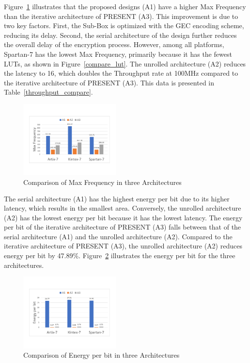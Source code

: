 \documentclass[final,5p,times,twocolumn]{elsarticle}
\begin{document}
Figure~\ref{compare-maxF} illustrates that the proposed designs (A1) have a higher Max Frequency than the iterative architecture of PRESENT (A3). This improvement is due to two key factors. First, the Sub-Box is optimized with the GEC encoding scheme, reducing its delay. Second, the serial architecture of the design further reduces the overall delay of the encryption process. However, among all platforms, Spartan-7 has the lowest Max Frequency, primarily because it has the fewest LUTs, as shown in Figure~\ref{compare_lut}. The unrolled architecture (A2) reduces the latency to 16, which doubles the Throughput rate at 100MHz compared to the iterative architecture of PRESENT (A3). This data is presented in Table~\ref{throughput_compare}.

\begin{figure}
    \centering
    \includegraphics[width=0.45\textwidth]{compare-maxf.pdf}
    \caption{Comparison of Max Frequency in three Architectures}\label{compare-maxF}
\end{figure}

The serial architecture (A1) has the highest energy per bit due to its higher latency, which results in the smallest area. Conversely, the unrolled architecture (A2) has the lowest energy per bit because it has the lowest latency. The energy per bit of the iterative architecture of PRESENT (A3) falls between that of the serial architecture (A1) and the unrolled architecture (A2). Compared to the iterative architecture of PRESENT (A3), the unrolled architecture (A2) reduces energy per bit by 47.89\%. Figure~\ref{compare-energy} illustrates the energy per bit for the three architectures.

\begin{figure}
    \centering
    \includegraphics[width=0.45\textwidth]{compare-energy.pdf}
    \caption{Comparison of Energy per bit in three Architectures}\label{compare-energy}
\end{figure}
\end{document}
